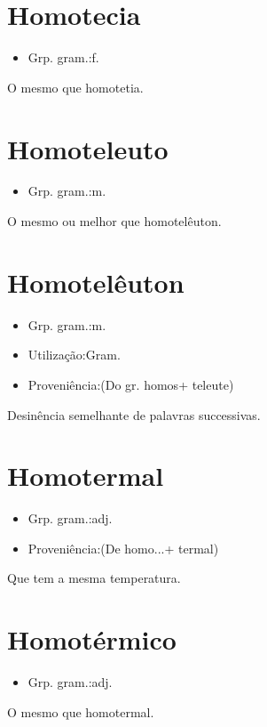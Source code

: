 \documentclass{article}
\begin{document}
\section{Homotecia}
\begin{itemize}
\item {Grp. gram.:f.}
\end{itemize}
O mesmo que \textunderscore homotetia\textunderscore .
\section{Homoteleuto}
\begin{itemize}
\item {Grp. gram.:m.}
\end{itemize}
O mesmo ou melhor que \textunderscore homotelêuton\textunderscore .
\section{Homotelêuton}
\begin{itemize}
\item {Grp. gram.:m.}
\end{itemize}
\begin{itemize}
\item {Utilização:Gram.}
\end{itemize}
\begin{itemize}
\item {Proveniência:(Do gr. \textunderscore homos\textunderscore  + \textunderscore teleute\textunderscore )}
\end{itemize}
Desinência semelhante de palavras successivas.
\section{Homotermal}
\begin{itemize}
\item {Grp. gram.:adj.}
\end{itemize}
\begin{itemize}
\item {Proveniência:(De \textunderscore homo...\textunderscore  + \textunderscore termal\textunderscore )}
\end{itemize}
Que tem a mesma temperatura.
\section{Homotérmico}
\begin{itemize}
\item {Grp. gram.:adj.}
\end{itemize}
O mesmo que \textunderscore homotermal\textunderscore .
\end{document}
